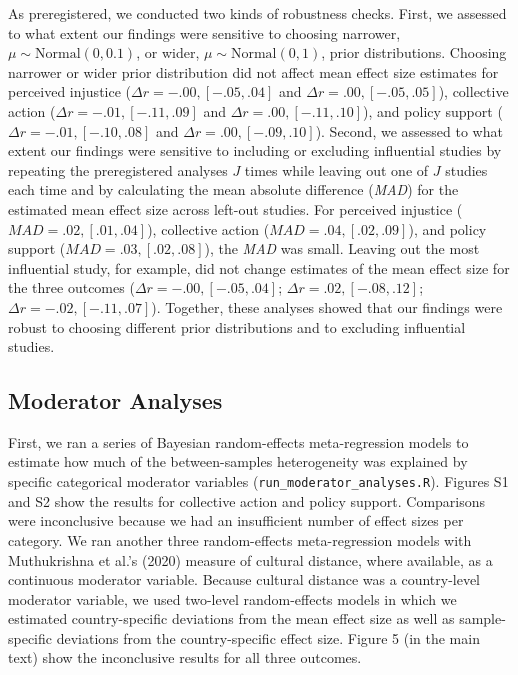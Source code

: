 \documentclass[12pt, letterpaper]{article}
\begin{document}
As preregistered, we conducted two kinds of robustness checks. First, we
assessed to what extent our findings were sensitive to choosing
narrower, \(\mu \sim \text{Normal}(0, 0.1)\), or wider,
\(\mu \sim \text{Normal}(0, 1)\), prior distributions. Choosing narrower
or wider prior distribution did not affect mean effect size estimates
for perceived injustice (\(\Delta r = -.00, [-.05, .04]\) and
\(\Delta r = .00, [-.05, .05]\)), collective action
(\(\Delta r = -.01, [-.11, .09]\) and \(\Delta r = .00, [-.11, .10]\)),
and policy support (\(\Delta r = -.01, [-.10, .08]\) and
\(\Delta r = .00, [-.09, .10]\)). Second, we assessed to what extent our
findings were sensitive to including or excluding influential studies by
repeating the preregistered analyses \(J\) times while leaving out one
of \(J\) studies each time and by calculating the mean absolute
difference (\emph{MAD}) for the estimated mean effect size across
left-out studies. For perceived injustice
(\(\textit{MAD} = .02, [.01, .04]\)), collective action
(\(\textit{MAD} = .04, [.02, .09]\)), and policy support
(\(\textit{MAD} = .03, [.02, .08]\)), the \emph{MAD} was small. Leaving
out the most influential study, for example, did not change estimates of
the mean effect size for the three outcomes
(\(\Delta r = -.00, [-.05, .04]\); \(\Delta r = .02, [-.08, .12]\);
\(\Delta r = -.02, [-.11, .07]\)). Together, these analyses showed that
our findings were robust to choosing different prior distributions and
to excluding influential studies.

\hypertarget{moderator-analyses}{%
\subsection{Moderator Analyses}\label{moderator-analyses}}

First, we ran a series of Bayesian random-effects meta-regression models
to estimate how much of the between-samples heterogeneity was explained
by specific categorical moderator variables
(\texttt{run\_moderator\_analyses.R}). Figures S1 and S2 show the
results for collective action and policy support. Comparisons were
inconclusive because we had an insufficient number of effect sizes per
category. We ran another three random-effects meta-regression models
with Muthukrishna et al.'s (2020) measure of cultural distance, where
available, as a continuous moderator variable. Because cultural distance
was a country-level moderator variable, we used two-level random-effects
models in which we estimated country-specific deviations from the mean
effect size as well as sample-specific deviations from the
country-specific effect size. Figure 5 (in the main text) show the
inconclusive results for all three outcomes.
\end{document}
